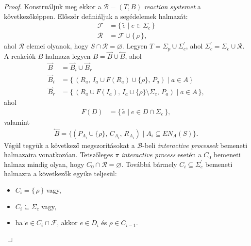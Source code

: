 \documentclass[12pt]{article}
\theoremstyle{definition}
\theoremstyle{remark}
\theoremstyle{plain}
\theoremstyle{plain}
\let\emptyset\varnothing
\newcommand{\forwardhat}{\overset{\rightharpoonup}}
\newcommand{\backwardhat}{\overset{\leftharpoonup}}
\newcommand{\reaction}[3]{
    (#1, \, #2, \, #3)
}
\begin{document}
\begin{proof}
        Konstruáljuk meg ekkor a $\mathscr{B} = (T, B)$ \textit{reaction systemet} a következőképpen. Először definiáljuk a segédelemek halmazát:
        \begin{align*}
            \mathcal{F} &= \{ \, \tilde{e} \;|\; e \in \Sigma_{c} \, \} \\
            \mathcal{R} &= \mathcal{F} \cup \{ \, \rho \, \},
        \end{align*}
        ahol $\mathcal{R}$ elemei olyanok, hogy $S \cap \mathcal{R} = \emptyset$.
        Legyen $T = \Sigma_{p} \cup \Sigma^{\prime}_{c}$, ahol $\Sigma^{\prime}_{c} = \Sigma_{c} \cup \mathcal{R}$. A reakciók $B$ halmaza legyen $B = \forwardhat B \cup \backwardhat B$, ahol
        \begin{align*}
            \forwardhat B &= \forwardhat B_{i} \cup \forwardhat B_{r} \\
            \forwardhat B_{i} &= \{ \, \reaction{ R_{a} }{ I_{a} \cup F(R_{a}) \cup \{ \rho \} }{ P_{a} } \;|\; a \in A \, \} \\
            \forwardhat B_{r} &= \{ \, \reaction{ R_{a} \cup F(I_{a}) }{ I_{a} \cup \{ \rho \} \setminus \Sigma_{c} }{ P_{a} }\;|\; a \in A \, \},
        \end{align*}
        ahol
        \begin{align*}
            F(D) &= \{ \, \tilde{e} \;|\; e \in D \cap \Sigma_{c} \, \},
        \end{align*}
        valamint
        \begin{align*}
            \backwardhat B = \{ \reaction{P_{A_{i}} \cup \{ \rho \}}{C_{A_{i}}}{R_{A_{i}}} \;|\; A_{i} \subseteq \textit{EN}_{A}(S) \}.
        \end{align*}
        Végül tegyük a következő megszorításokat a $\mathscr{B}$-beli \textit{interactive processek} bemeneti halmazaira vonatkozóan. Tetszőleges $\pi$ \textit{interactive process} esetén a $C_{0}$ bemeneti halmaz mindig olyan, hogy $C_{0} \cap \mathcal{R} = \emptyset$. Továbbá bármely $C_{i} \subseteq \Sigma^{\prime}_{c}$ bemeneti halmazra a következők egyike teljesül:
        \begin{itemize}
            \item    
            $C_{i} = \{\, \rho \,\}$ vagy,
            \item
            $C_{i} \subseteq \Sigma_{c}$ vagy,
            \item
            ha $\tilde{e} \in C_{i} \cap \mathcal{F}$, akkor $e \in D_{i}$ és $\rho \in C_{i - 1}$.
        \end{itemize}


\end{proof}
\end{document}
